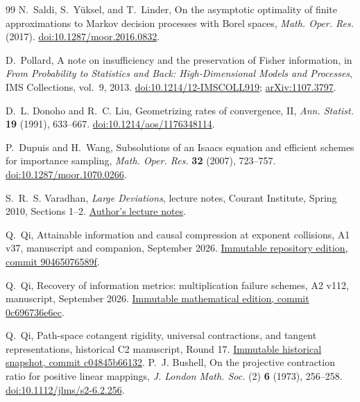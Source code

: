 \begin{thebibliography}{99}
N.~Saldi, S.~Y\"uksel, and T.~Linder,
On the asymptotic optimality of finite approximations to Markov decision
processes with Borel spaces, \emph{Math. Oper. Res.} (2017).
\href{https://doi.org/10.1287/moor.2016.0832}{doi:10.1287/moor.2016.0832}.

D.~Pollard, A note on insufficiency and the preservation of Fisher
information, in \emph{From Probability to Statistics and Back:
High-Dimensional Models and Processes}, IMS Collections, vol.~9, 2013.
\href{https://doi.org/10.1214/12-IMSCOLL919}{doi:10.1214/12-IMSCOLL919};
\href{https://arxiv.org/abs/1107.3797}{arXiv:1107.3797}.

D.~L. Donoho and R.~C. Liu, Geometrizing rates of convergence, II,
\emph{Ann. Statist.} \textbf{19} (1991), 633--667.
\href{https://doi.org/10.1214/aos/1176348114}{doi:10.1214/aos/1176348114}.

P.~Dupuis and H.~Wang, Subsolutions of an Isaacs equation and efficient
schemes for importance sampling, \emph{Math. Oper. Res.} \textbf{32}
(2007), 723--757.
\href{https://doi.org/10.1287/moor.1070.0266}{doi:10.1287/moor.1070.0266}.

S.~R.~S. Varadhan, \emph{Large Deviations}, lecture notes, Courant Institute,
Spring 2010, Sections 1--2.
\href{https://math.nyu.edu/~varadhan/LDP/1-2.pdf}{Author's lecture notes}.

Q.~Qi, Attainable information and causal compression at exponent collisions,
A1 v37, manuscript and companion, September 2026.
\href{https://github.com/TrillionniumFoundation/theta-theory/tree/90465076589f5e5c69227d624f278c47744f1c1d/papers/A1-english-v37-publication}{Immutable repository edition, commit 90465076589f}.

Q.~Qi, Recovery of information metrics: multiplication failure schemes,
A2 v112, manuscript, September 2026.
\href{https://github.com/TrillionniumFoundation/theta-theory/tree/0c696736e6ec22259c730672f61ebd8ef0d95460/papers/A2-v17-boundary-information-coarsening/article/v112}{Immutable mathematical edition, commit 0c696736e6ec}.

Q.~Qi, Path-space cotangent rigidity, universal contractions, and tangent
representations, historical C2 manuscript, Round 17.
\href{https://github.com/TrillionniumFoundation/theta-theory/tree/c04845b6613208406703695c9c184ae461f95805/papers/C2-cotangent-rigidity-tangent-representations}{Immutable historical snapshot, commit c04845b66132}.
P.~J. Bushell, On the projective contraction ratio for positive linear
mappings, \emph{J. London Math. Soc.} (2) \textbf{6} (1973), 256--258.
\href{https://doi.org/10.1112/jlms/s2-6.2.256}{doi:10.1112/jlms/s2-6.2.256}.


\end{thebibliography}
